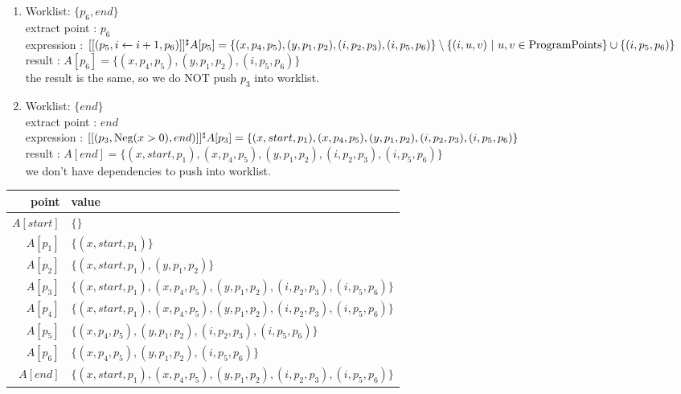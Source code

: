 \documentclass[a4paper]{article}
\begin{document}
\begin{enumerate}
  \item Worklist: $ \{ p_6, end \} $ \\
  extract point : $ p_6 $ \\
  expression : $ [[(p_5, i \leftarrow i + 1, p_6)]]^\sharp A[p_5] = \{ (x, p_4, p_5), (y, p_1, p_2), (i, p_2, p_3), (i, p_5, p_6) \} \setminus \{ (i, u, v)\ |\ u, v \in \mathrm{ProgramPoints} \} \cup \{ (i, p_5, p_6) \} $ \\
  result : $ A[p_6] = \{ (x, p_4, p_5), (y, p_1, p_2), (i, p_5, p_6) \} $ \\
  the result is the same, so we do NOT push $ p_3 $ into worklist.

  \item Worklist: $ \{ end \} $ \\
  extract point : $ end $ \\
  expression : $ [[(p_3, \mathrm{Neg}(x > 0), end)]]^\sharp A[p_3] = \{ (x, start, p_1), (x, p_4, p_5), (y, p_1, p_2), (i, p_2, p_3), (i, p_5, p_6) \} $ \\
  result : $ A[end] = \{ (x, start, p_1), (x, p_4, p_5), (y, p_1, p_2), (i, p_2, p_3), (i, p_5, p_6) \} $ \\
  we don't have dependencies to push into worklist.


\end{enumerate}

\begin{tabular}{|r|l|}
  \hline
  point & value \\ \hline \hline
  $ A[start] $ & $ \{\} $ \\ \hline
  $ A[p_1] $ & $ \{ (x, start, p_1) \} $ \\ \hline
  $ A[p_2] $ & $ \{ (x, start, p_1), (y, p_1, p_2) \} $ \\ \hline
  $ A[p_3] $ & $ \{ (x, start, p_1), (x, p_4, p_5), (y, p_1, p_2), (i, p_2, p_3), (i, p_5, p_6) \} $ \\ \hline
  $ A[p_4] $ & $ \{ (x, start, p_1), (x, p_4, p_5), (y, p_1, p_2), (i, p_2, p_3), (i, p_5, p_6) \} $ \\ \hline
  $ A[p_5] $ & $ \{ (x, p_4, p_5), (y, p_1, p_2), (i, p_2, p_3), (i, p_5, p_6) \} $ \\ \hline
  $ A[p_6] $ & $ \{ (x, p_4, p_5), (y, p_1, p_2), (i, p_5, p_6) \} $ \\ \hline
  $ A[end] $ & $ \{ (x, start, p_1), (x, p_4, p_5), (y, p_1, p_2), (i, p_2, p_3), (i, p_5, p_6) \} $ \\ \hline
\end{tabular}
\end{document}
